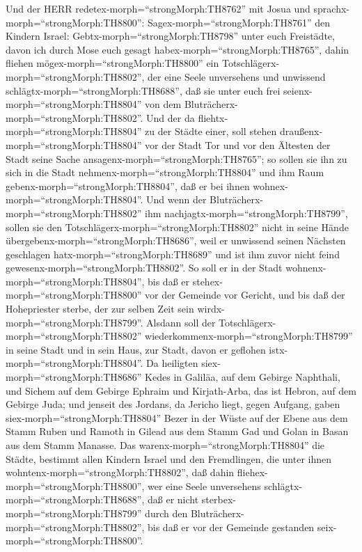  Und der HERR redetex-morph=``strongMorph:TH8762'' mit Josua
und sprachx-morph=``strongMorph:TH8800'': 
Sagex-morph=``strongMorph:TH8761'' den Kindern Israel:
Gebtx-morph=``strongMorph:TH8798'' unter euch Freistädte, davon ich
durch Mose euch gesagt habex-morph=``strongMorph:TH8765'', 
dahin fliehen mögex-morph=``strongMorph:TH8800'' ein
Totschlägerx-morph=``strongMorph:TH8802'', der eine Seele unversehens
und unwissend schlägtx-morph=``strongMorph:TH8688'', daß sie unter euch
frei seienx-morph=``strongMorph:TH8804'' von dem
Bluträcherx-morph=``strongMorph:TH8802''.  Und der da
fliehtx-morph=``strongMorph:TH8804'' zu der Städte einer, soll stehen
draußenx-morph=``strongMorph:TH8804'' vor der Stadt Tor und vor den
Ältesten der Stadt seine Sache ansagenx-morph=``strongMorph:TH8765''; so
sollen sie ihn zu sich in die Stadt nehmenx-morph=``strongMorph:TH8804''
und ihm Raum gebenx-morph=``strongMorph:TH8804'', daß er bei ihnen
wohnex-morph=``strongMorph:TH8804''.  Und wenn der
Bluträcherx-morph=``strongMorph:TH8802'' ihm
nachjagtx-morph=``strongMorph:TH8799'', sollen sie den
Totschlägerx-morph=``strongMorph:TH8802'' nicht in seine Hände
übergebenx-morph=``strongMorph:TH8686'', weil er unwissend seinen
Nächsten geschlagen hatx-morph=``strongMorph:TH8689'' und ist ihm zuvor
nicht feind gewesenx-morph=``strongMorph:TH8802''.  So soll
er in der Stadt wohnenx-morph=``strongMorph:TH8804'', bis daß er
stehex-morph=``strongMorph:TH8800'' vor der Gemeinde vor Gericht, und
bis daß der Hohepriester sterbe, der zur selben Zeit sein
wirdx-morph=``strongMorph:TH8799''. Alsdann soll der
Totschlägerx-morph=``strongMorph:TH8802''
wiederkommenx-morph=``strongMorph:TH8799'' in seine Stadt und in sein
Haus, zur Stadt, davon er geflohen istx-morph=``strongMorph:TH8804''.
 Da heiligten siex-morph=``strongMorph:TH8686'' Kedes in
Galiläa, auf dem Gebirge Naphthali, und Sichem auf dem Gebirge Ephraim
und Kirjath-Arba, das ist Hebron, auf dem Gebirge Juda;  und
jenseit des Jordans, da Jericho liegt, gegen Aufgang, gaben
siex-morph=``strongMorph:TH8804'' Bezer in der Wüste auf der Ebene aus
dem Stamm Ruben und Ramoth in Gilead aus dem Stamm Gad und Golan in
Basan aus dem Stamm Manasse.  Das
warenx-morph=``strongMorph:TH8804'' die Städte, bestimmt allen Kindern
Israel und den Fremdlingen, die unter ihnen
wohntenx-morph=``strongMorph:TH8802'', daß dahin
fliehex-morph=``strongMorph:TH8800'', wer eine Seele unversehens
schlägtx-morph=``strongMorph:TH8688'', daß er nicht
sterbex-morph=``strongMorph:TH8799'' durch den
Bluträcherx-morph=``strongMorph:TH8802'', bis daß er vor der Gemeinde
gestanden seix-morph=``strongMorph:TH8800''.

